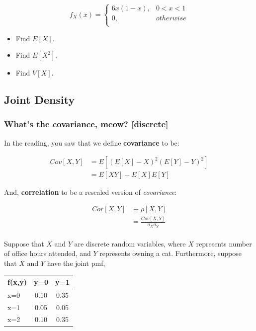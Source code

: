 \documentclass[
]{book}
\providecommand{\tightlist}{%
  \setlength{\itemsep}{0pt}\setlength{\parskip}{0pt}}
\theoremstyle{definition}
\theoremstyle{definition}
\theoremstyle{definition}
\theoremstyle{definition}
\theoremstyle{remark}
\begin{document}
\[
  f_{X}(x) = \begin{cases} 
    6x(1 - x), & 0 < x < 1 \\ 
    0, & otherwise \\ 
  \end{cases}
\]

\begin{itemize}
\tightlist
\item
  Find \(E[X]\).
\item
  Find \(E[X^2]\).
\item
  Find \(V[X]\).
\end{itemize}

\subsection{Joint Density}\label{joint-density-1}

\subsubsection{What's the covariance, meow? {[}discrete{]}}\label{whats-the-covariance-meow-discrete}

In the reading, you saw that we define \textbf{covariance} to be:

\[
\begin{aligned}
Cov[X,Y]    &= E[(E[X] - X)^{2}(E[Y] - Y)^{2}] \\ 
            &= E[XY] - E[X]E[Y]
\end{aligned} 
\]

And, \textbf{correlation} to be a rescaled version of \emph{covariance}:

\[
\begin{aligned}
Cor[X,Y]    & \equiv \rho[X,Y] \\ 
            & = \frac{Cov[X,Y]}{\sigma_{X}\sigma_{Y}} \\
\end{aligned}            
\]

Suppose that \(X\) and \(Y\) are discrete random variables, where \(X\) represents number of office hours attended, and \(Y\) represents owning a cat. Furthermore, suppose that \(X\) and \(Y\) have the joint pmf,

\begin{longtable}[]{@{}lcc@{}}
\toprule\noalign{}
f(x,y) & y=0 & y=1 \\
\midrule\noalign{}
\endhead
\bottomrule\noalign{}
\endlastfoot
x=0 & 0.10 & 0.35 \\
x=1 & 0.05 & 0.05 \\
x=2 & 0.10 & 0.35 \\
\end{longtable}
\end{document}
